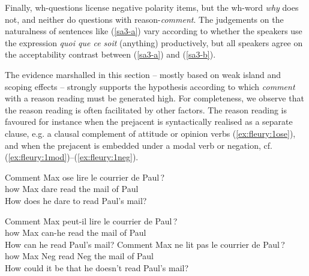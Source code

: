 \documentclass[output=paper,colorlinks,citecolor=brown,
]{langscibook}
\begin{document}
Finally,
wh-questions license negative polarity items,
but the wh-word \textit{why\/} does not, and neither do questions with reason-\textit{comment}.
The judgements on the naturalness of  sentences like (\ref{sa3-a}) vary according to whether the speakers use the expression \textit{quoi que ce soit} (anything) productively, but all speakers agree on the acceptability contrast between (\ref{sa3-a}) and (\ref{sa3-b}).

\begin{exe}
\ex\label{sa3} 
\begin{xlist}
\end{xlist}
\end{exe}

The evidence marshalled in this section -- mostly based on weak island and scoping effects -- strongly supports the hypothesis according to which \textit{comment} with a reason reading must be generated high.  
For completeness, we observe that the reason reading is often facilitated by other factors.
The reason reading is favoured  for instance  when
the prejacent is syntactically realised  as a separate clause, e.g.  a clausal complement of  attitude or opinion verbs (\ref{ex:fleury:1ose}), and when the prejacent is embedded under a modal {verb} or negation, cf. (\ref{ex:fleury:1mod})--(\ref{ex:fleury:1neg}).

\begin{exe}
\ex\label{ex:fleury:1ose} \gll Comment Max ose lire le courrier de Paul\,? \\
how Max dare read the mail of Paul \\
\glt How does he dare to read Paul's mail?
\end{exe}

\begin{exe}
\ex
\begin{xlist}
\ex\label{ex:fleury:1mod} \gll Comment Max peut-il lire le courrier de Paul\,? \\
how Max can-he read the mail of Paul  \\
\glt How can he read Paul's mail?
\ex\label{ex:fleury:1neg} \gll Comment Max ne lit pas le courrier de Paul\,?  \\ 
how Max Neg read Neg the mail of Paul  \\
\glt How could it be that he doesn't read Paul's mail?
\end{xlist}
\end{exe}
\end{document}
